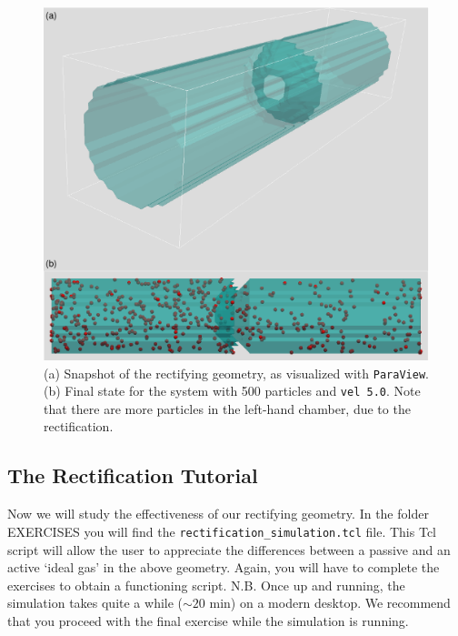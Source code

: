 \documentclass[aip,jcp,reprint,a4paper,onecolumn,amsmath]{revtex4-1}
\newcommand\code{\lstinline}
\newcommand\codees{\lstinline[language=espresso]}
\begin{document}
\begin{figure}[!htb]
\begin{center}
\includegraphics[scale=0.75]{FIGURES/rectify}
\end{center}
\caption{\label{fig:rectify}(a) Snapshot of the rectifying geometry, as visualized with \code{ParaView}. (b) Final state for the system with 500 particles and \codees{vel 5.0}. Note that there are more particles in the left-hand chamber, due to the rectification.}
\end{figure}

\subsection{\label{sub:rstut}The Rectification Tutorial}

Now we will study the effectiveness of our rectifying geometry. In the folder EXERCISES you will find the \code{rectification_simulation.tcl} file. This Tcl script will allow the user to appreciate the differences between a passive and an active `ideal gas' in the above geometry. Again, you will have to complete the exercises to obtain a functioning script. N.B. Once up and running, the simulation takes quite a while ($\sim20$ min) on a modern desktop. We recommend that you proceed with the final exercise while the simulation is running.
\end{document}
